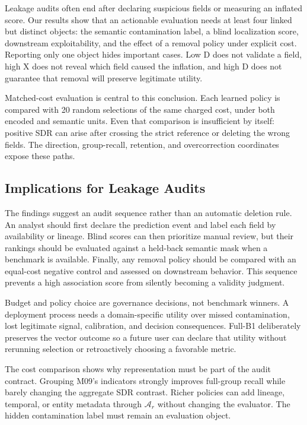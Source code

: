 \documentclass[sigconf,review]{acmart}
\begin{document}
Leakage audits often end after declaring suspicious fields or measuring an
inflated score. Our results show that an actionable evaluation needs at least
four linked but distinct objects: the semantic contamination label, a blind
localization score, downstream exploitability, and the effect of a removal
policy under explicit cost. Reporting only one object hides important cases.
Low D does not validate a field, high X does not reveal which field caused the
inflation, and high D does not guarantee that removal will preserve legitimate
utility.

Matched-cost evaluation is central to this conclusion. Each learned policy is
compared with 20 random selections of the same charged cost, under both encoded
and semantic units. Even that comparison is insufficient by itself: positive
SDR can arise after crossing the strict reference or deleting the wrong fields.
The direction, group-recall, retention, and overcorrection coordinates expose
these paths.

\subsection{Implications for Leakage Audits}

The findings suggest an audit sequence rather than an automatic deletion rule.
An analyst should first declare the prediction event and label each field by
availability or lineage. Blind scores can then prioritize manual review, but
their rankings should be evaluated against a held-back semantic mask when a
benchmark is available. Finally, any removal policy should be compared with an
equal-cost negative control and assessed on downstream behavior. This sequence
prevents a high association score from silently becoming a validity judgment.

Budget and policy choice are governance decisions, not benchmark winners. A
deployment process needs a domain-specific utility over missed contamination,
lost legitimate signal, calibration, and decision consequences. Full-B1
deliberately preserves the vector outcome so a future user can declare that
utility without rerunning selection or retroactively choosing a favorable
metric.

The cost comparison shows why representation must be part of the audit
contract. Grouping M09's indicators strongly improves full-group recall while
barely changing the aggregate SDR contrast. Richer policies can add lineage,
temporal, or entity metadata through $\mathcal{A}_r$ without changing the
evaluator. The hidden contamination label must remain an evaluation object.
\end{document}
